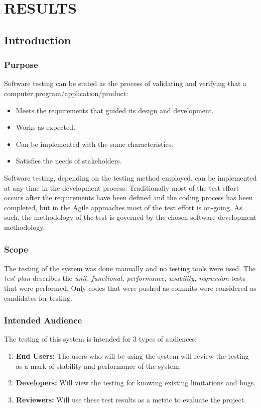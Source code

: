 \chapter {RESULTS}
\section{Introduction}
\subsection{Purpose}
Software testing can be stated as the process of validating and verifying that a computer program/application/product:
\begin{itemize}
\item Meets the requirements that guided its design and development.
\item Works as expected.
\item Can be implemented with the same characteristics.
\item Satisfies the needs of stakeholders.
\end{itemize}

Software testing, depending on the testing method employed, can be implemented at any time in the development process. Traditionally most of the test effort occurs after the requirements have been defined and the coding process has been completed, but in the Agile approaches most of the test effort is on-going. As such, the methodology of the test is governed by the chosen software development methodology.

\subsection{Scope}
The testing of the system was done manually and no testing tools were used. The \emph{test plan} describes the \emph{unit, functional, performance, usability, regression} tests that were performed. Only codes that were pushed as commits were considered as candidates for testing.

\subsection{Intended Audience}
The testing of this system is intended for 3 types of audiences:
\begin{enumerate}
\item \textbf{End Users:} The users who will be using the system will review the testing as a mark of stability and performance of the system.
\item \textbf{Developers:} Will view the testing for knowing existing limitations and bugs.
\item \textbf{Reviewers:} Will use these test results as a metric to evaluate the project.
\end{enumerate}

